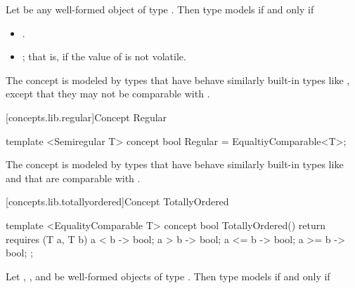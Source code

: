 \begin{addedblock}
\begin{itemdescr}
\pnum
Let  be any well-formed object of type . Then type  models
 if and only if

\begin{itemize}
\item {}.
\item {}; that is, if the value of  is not volatile.
\end{itemize}

\pnum
\enternote The  concept is modeled by types that have behave similarly
built-in types like , except that they may not be comparable with \tcode{==}.\exitnote
\end{itemdescr}

[concepts.lib.regular]{Concept Regular}

%
\begin{itemdecl}
template <Semiregular T>
concept bool Regular =
  EqualtiyComparable<T>;
\end{itemdecl}

\begin{itemdescr}
\pnum
\enternote The  concept is modeled by types that have behave similarly
built-in types like  and that are comparable with \tcode{==}.\exitnote
\end{itemdescr}

[concepts.lib.totallyordered]{Concept TotallyOrdered}


%
\begin{itemdecl}
template <EqualityComparable T>
concept bool TotallyOrdered() {
  return requires (T a, T b) {
    { a < b } -> bool;
    { a > b } -> bool;
    { a <= b } -> bool;
    { a >= b } -> bool;
  };
}
\end{itemdecl}

\begin{itemdescr}
\pnum
Let , , and  be well-formed objects of type . Then type
 models  if and only if


\end{itemdescr}
\end{addedblock}
